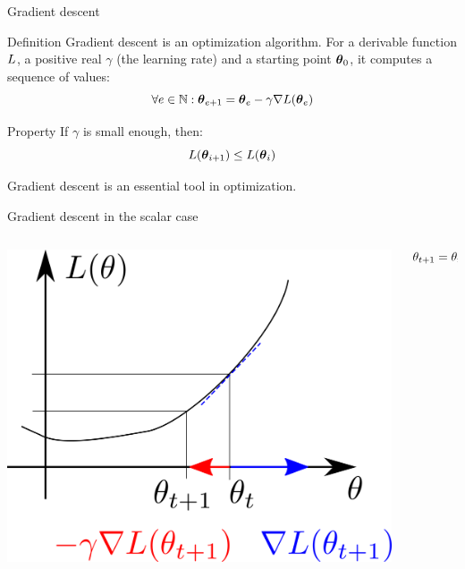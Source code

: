 \documentclass[xcolor=pdftex,dvipsnames,table,mathserif]{beamer}
\begin{document}
\begin{frame}{Gradient descent}

\begin{block}{Definition}
  Gradient descent is an optimization algorithm. For a derivable function $L$, a positive real $\gamma$ (the \alert{learning rate}) and a starting point $\boldsymbol{\theta}_0$, it computes a sequence of values:
  \[
  \forall e \in \mathbb{N}: \boldsymbol{\theta}_{e+1} = \boldsymbol{\theta}_e - \gamma \nabla L(\boldsymbol{\theta}_e)
  \]
\end{block}

\begin{block}{Property}
  If $\gamma$ is small enough, then:
  \[
  L(\boldsymbol{\theta}_{i+1}) \leq L(\boldsymbol{\theta}_i)
  \]
\end{block}

Gradient descent is an essential tool in optimization.

\end{frame}

\begin{frame}{Gradient descent in the scalar case}

\begin{columns}
  \begin{column}{.5\textwidth}
    \includegraphics[width=\textwidth]{../graphics/gradient_descent}
  \end{column}

  \begin{column}{.5\textwidth}
    \[
    \theta_{t+1} = \theta_t - \gamma\nabla L(\theta_t)
    \]
  \end{column}
\end{columns}

\end{frame}
\end{document}
